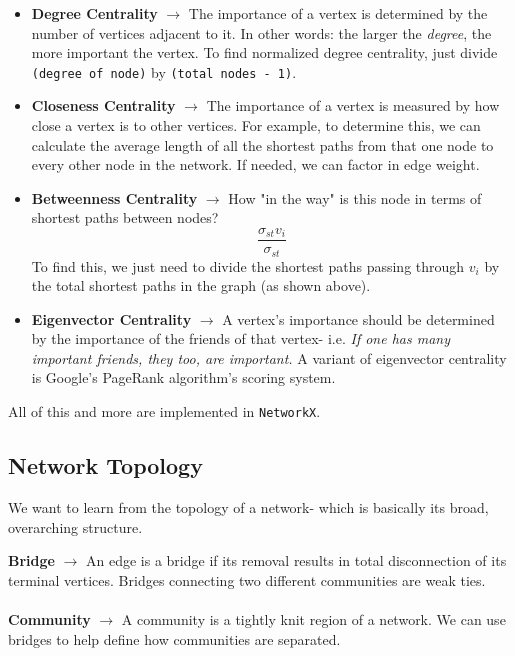 \documentclass[english, 10pt]{article}
\begin{document}
\begin{itemize}
	\item \textbf{Degree Centrality} $\rightarrow$ The importance of a vertex is determined by the number of vertices adjacent to it. In other words: the larger the \textit{degree}, the more important the vertex. To find normalized degree centrality, just divide \texttt{(degree of node)} by \texttt{(total nodes - 1)}.
	\item \textbf{Closeness Centrality} $\rightarrow$ The importance of a vertex is measured by how close a vertex is to other vertices. For example, to determine this, we can calculate the average length of all the shortest paths from that one node to every other node in the network. If needed, we can factor in edge weight.
	\item \textbf{Betweenness Centrality} $\rightarrow$ How "in the way" is this node in terms of shortest paths between nodes?
	$$\frac{\sigma_{st} v_i}{\sigma_{st}}$$
	To find this, we just need to divide the shortest paths passing through $v_i$ by the total shortest paths in the graph (as shown above).
	\item \textbf{Eigenvector Centrality} $\rightarrow$ A vertex's importance should be determined by the importance of the friends of that vertex- i.e. \textit{If one has many important friends, they too, are important.} A variant of eigenvector centrality is Google's PageRank algorithm's scoring system.
\end{itemize}

All of this and more are implemented in \texttt{NetworkX}.

\subsection{Network Topology}

We want to learn from the topology of a network- which is basically its broad, overarching structure.\\

\begin{tcolorbox}[title=Definition:,colframe=red!75!black,colback=red!5!white,arc=0pt,fonttitle=\bfseries]
\textbf{Bridge} $\rightarrow$ An edge is a bridge if its removal results in total disconnection of its terminal vertices. Bridges connecting two different communities are weak ties.\\\\
\textbf{Community} $\rightarrow$ A community is a tightly knit region of a network. We can use bridges to help define how communities are separated.
\end{tcolorbox}
\end{document}
